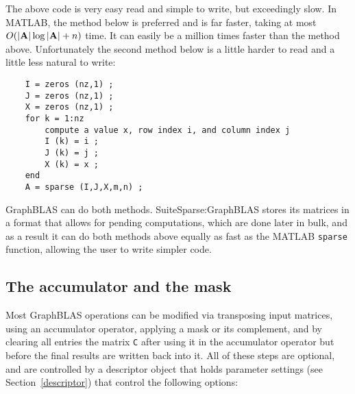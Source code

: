 \documentclass[12pt]{article}
\begin{document}
The above code is very easy read and simple to write, but exceedingly slow.  In
MATLAB, the method below is preferred and is far faster, taking at most
$O(|{\bf A}| \log |{\bf A}| +n)$ time.  It can easily be a million times faster
than the method above.  Unfortunately the second method below is a little
harder to read and a little less natural to write:

    \begin{mdframed}
    {\footnotesize
    \begin{verbatim}
    I = zeros (nz,1) ;
    J = zeros (nz,1) ;
    X = zeros (nz,1) ;
    for k = 1:nz
        compute a value x, row index i, and column index j
        I (k) = i ;
        J (k) = j ;
        X (k) = x ;
    end
    A = sparse (I,J,X,m,n) ;   \end{verbatim}} \end{mdframed}

GraphBLAS can do both methods.  SuiteSparse:GraphBLAS stores its matrices in a
format that allows for pending computations, which are done later in bulk, and
as a result it can do both methods above equally as fast as the MATLAB
\verb'sparse' function, allowing the user to write simpler code.

\subsection{The accumulator and the mask} %
\label{accummask}

Most GraphBLAS operations can be modified via transposing input matrices, using
an accumulator operator, applying a mask or its complement, and by clearing all
entries the matrix \verb'C' after using it in the accumulator operator but
before the final results are written back into it.  All of these steps are
optional, and are controlled by a descriptor object that holds parameter
settings (see Section~\ref{descriptor}) that control the following options:
\end{document}
